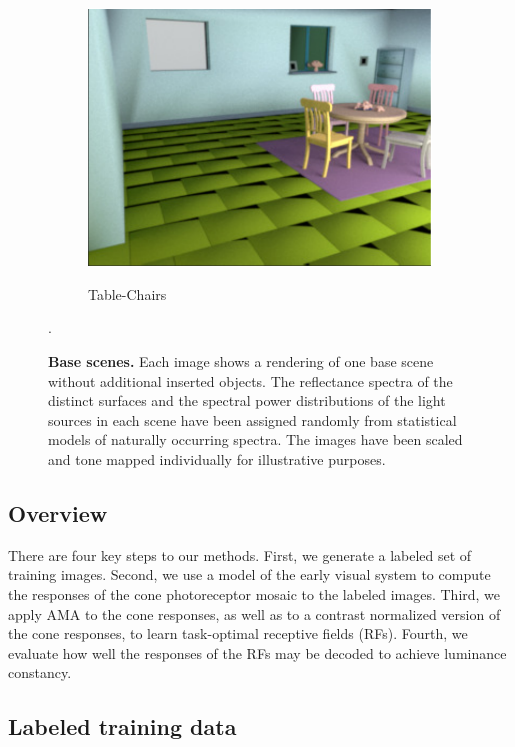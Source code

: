 \documentclass{jov}
\begin{document}
\begin{figure}
\begin{subfigure}[b]{0.22 \textwidth}
        \label{fig:baseSceneMill}
    \end{subfigure}    
    ~
    \begin{subfigure}[b]{0.22 \textwidth}
        \caption{Table-Chairs}    
        \includegraphics[width=\textwidth]{../FiguresDraft5/Figure2/Figure2_c.pdf}
        \label{fig:baseSceneTableChairs}
    \end{subfigure}
    \caption{{\bf Base scenes.} Each image shows a rendering of one base scene without additional inserted objects.  The reflectance spectra of the distinct surfaces and the spectral power distributions of the light sources in each scene have been assigned randomly from statistical models of naturally occurring spectra. The images have been scaled and tone mapped individually for illustrative purposes.}
\label{fig:baseScenes}. \end{figure}

\subsection{Overview}
There are four key steps to our methods.  First, we generate a labeled set of training images.  Second, we use a model of the early visual system to compute the responses of the cone photoreceptor mosaic to the labeled images. Third, we apply AMA to the cone responses, as well as to a contrast normalized version of the cone responses, to learn task-optimal receptive fields (RFs). Fourth, we evaluate how well the responses of the RFs may be decoded to achieve luminance constancy.

\subsection{Labeled training data} \label{method:VirtualWorld}
\end{document}
